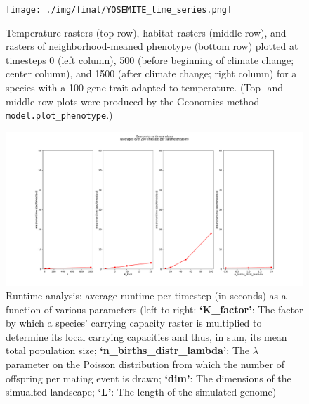 ﻿\documentclass{article}
\begin{document}
\begin{figure}[ht!]
        \texttt{[image: ./img/final/YOSEMITE\_time\_series.png]}
        \caption{Temperature rasters (top row),
                 habitat rasters (middle row),
                 and rasters of neighborhood-meaned phenotype (bottom row)
                 plotted at timesteps 0 (left column),
                 500 (before beginning of climate change; center column),
                 and 1500 (after climate change; right column)
                 for a species with a 100-gene trait adapted to temperature.
                 (Top- and middle-row plots were produced
                 by the Geonomics method \texttt{model.plot\_phenotype}.)}
        \label{fig:yosemite}
\end{figure}


\begin{figure}[ht!]
        \includegraphics[width=175mm]{./img/final/runtime.pdf}
        \caption{Runtime analysis: average runtime per timestep (in seconds)
                 as a function of various parameters
                 (left to right: \textbf{`K\_factor'}:
                 The factor by which a species' carrying capacity
                 raster is multiplied to determine its local carrying capacities
                 and thus, in sum, its mean total population size;
                 \textbf{`n\_births\_distr\_lambda'}:
                 The $\lambda$ parameter on the Poisson distribution from which
                 the number of offspring per mating event is drawn;
                 \textbf{`dim'}: The dimensions of the simualted landscape;
                 \textbf{`L'}: The length of the simulated genome)}
        \label{fig:runtime}
\end{figure}
\end{document}
